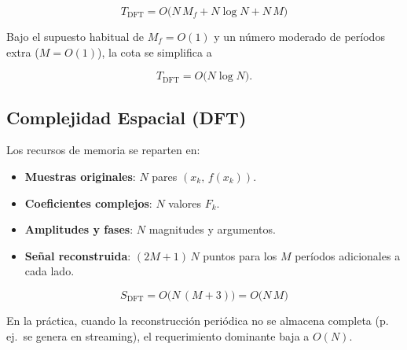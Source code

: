 \[
\boxed{\;
	T_{\text{DFT}}
	= O\!\bigl(N \, M_{f} + N \log N + N \, M\bigr)
	\;}
\]

Bajo el supuesto habitual de $M_{f}=O(1)$ y un número moderado de
períodos extra ($M=O(1)$), la cota se simplifica a

\[
T_{\text{DFT}} = O\!\bigl(N \log N\bigr).
\]

\subsection{Complejidad Espacial (DFT)}

Los recursos de memoria se reparten en:

\begin{itemize}
	\item \textbf{Muestras originales}: $N$ pares $(x_k,\,f(x_k))$.
	\item \textbf{Coeficientes complejos}: $N$ valores $F_k$.
	\item \textbf{Amplitudes y fases}: $N$ magnitudes y argumentos.
	\item \textbf{Señal reconstruida}: $(2M+1)\,N$ puntos para los $M$
	períodos adicionales a cada lado.
\end{itemize}

\[
\boxed{\;
	S_{\text{DFT}}
	= O\!\bigl(N \,(M + 3)\bigr)
	= O\!\bigl(N\,M\bigr)
	\;}
\]

En la práctica, cuando la reconstrucción periódica no se almacena
completa (p.\,ej.\ se genera en streaming), el requerimiento dominante
baja a $O(N)$.

